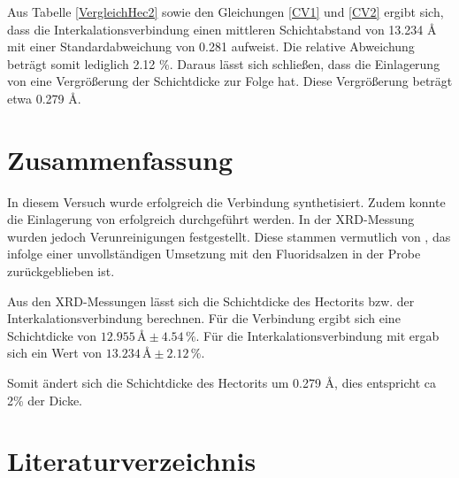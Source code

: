 \documentclass[12pt, a4paper]{article}
\begin{document}
\noindent
Aus Tabelle \ref{VergleichHec2} sowie den Gleichungen \ref{CV1} und \ref{CV2} ergibt sich, dass die Interkalationsverbindung einen mittleren Schichtabstand von
13.234 \AA \,mit einer Standardabweichung von 0.281 aufweist. Die relative Abweichung beträgt somit lediglich 2.12 \%. Daraus lässt sich schließen, dass die Einlagerung von  eine Vergrößerung der Schichtdicke zur Folge hat. Diese Vergrößerung beträgt etwa 0.279 \AA.






\newpage









\newpage
\section{Zusammenfassung}
In diesem Versuch wurde erfolgreich die Verbindung  synthetisiert. Zudem konnte die Einlagerung von  erfolgreich durchgeführt werden.
In der XRD-Messung wurden jedoch Verunreinigungen festgestellt. Diese stammen vermutlich von , 
das infolge einer unvollständigen Umsetzung mit den Fluoridsalzen in der Probe zurückgeblieben 
ist.



\noindent
Aus den XRD-Messungen lässt sich die Schichtdicke des Hectorits bzw. der Interkalationsverbindung berechnen. Für die Verbindung 
ergibt sich eine Schichtdicke von
\mbox{$ 12.955\,\text{\AA} \pm 4.54\,\%$.}
Für die Interkalationsverbindung mit  ergab sich ein Wert von 
\mbox{$ 13.234\,\text{\AA} \pm 2.12\,\%$.}

\noindent
Somit ändert sich die Schichtdicke des Hectorits um  0.279 \AA, dies entspricht ca 2\% der Dicke. 




\newpage
\section{Literaturverzeichnis}
\printbibliography
\end{document}
